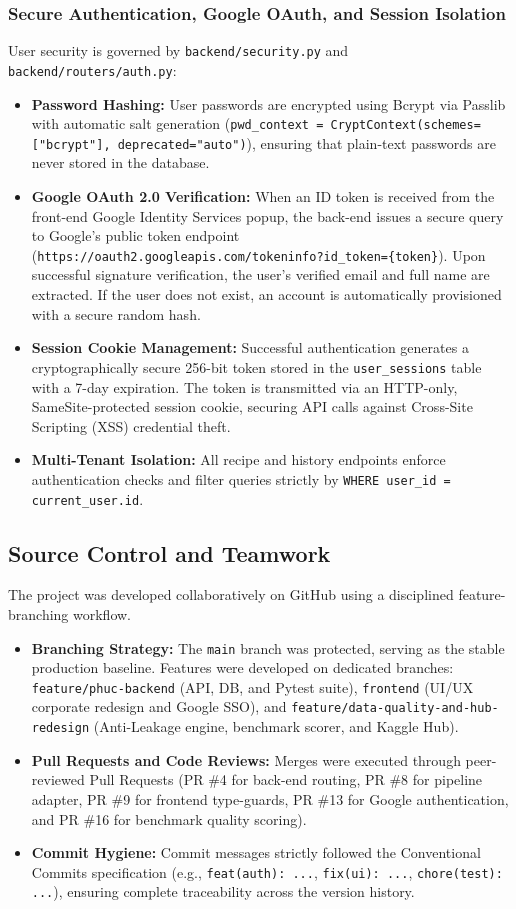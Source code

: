 \subsubsection{Secure Authentication, Google OAuth, and Session Isolation}
User security is governed by \texttt{backend/security.py} and \texttt{backend/routers/auth.py}:
\begin{itemize}
  \item \textbf{Password Hashing:} User passwords are encrypted using Bcrypt via Passlib with automatic salt generation (\texttt{pwd\_context = CryptContext(schemes=["bcrypt"], deprecated="auto")}), ensuring that plain-text passwords are never stored in the database.
  \item \textbf{Google OAuth 2.0 Verification:} When an ID token is received from the front-end Google Identity Services popup, the back-end issues a secure query to Google's public token endpoint (\texttt{https://oauth2.googleapis.com/tokeninfo?id\_token=\{token\}}). Upon successful signature verification, the user's verified email and full name are extracted. If the user does not exist, an account is automatically provisioned with a secure random hash.
  \item \textbf{Session Cookie Management:} Successful authentication generates a cryptographically secure 256-bit token stored in the \texttt{user\_sessions} table with a 7-day expiration. The token is transmitted via an HTTP-only, SameSite-protected session cookie, securing API calls against Cross-Site Scripting (XSS) credential theft.
  \item \textbf{Multi-Tenant Isolation:} All recipe and history endpoints enforce authentication checks and filter queries strictly by \texttt{WHERE user\_id = current\_user.id}.
\end{itemize}

\subsection{Source Control and Teamwork}
The project was developed collaboratively on GitHub using a disciplined feature-branching workflow.
\begin{itemize}
  \item \textbf{Branching Strategy:} The \texttt{main} branch was protected, serving as the stable production baseline. Features were developed on dedicated branches: \texttt{feature/phuc-backend} (API, DB, and Pytest suite), \texttt{frontend} (UI/UX corporate redesign and Google SSO), and \texttt{feature/data-quality-and-hub-redesign} (Anti-Leakage engine, benchmark scorer, and Kaggle Hub).
  \item \textbf{Pull Requests and Code Reviews:} Merges were executed through peer-reviewed Pull Requests (PR \#4 for back-end routing, PR \#8 for pipeline adapter, PR \#9 for frontend type-guards, PR \#13 for Google authentication, and PR \#16 for benchmark quality scoring).
  \item \textbf{Commit Hygiene:} Commit messages strictly followed the Conventional Commits specification (e.g., \texttt{feat(auth): ...}, \texttt{fix(ui): ...}, \texttt{chore(test): ...}), ensuring complete traceability across the version history.
\end{itemize}

